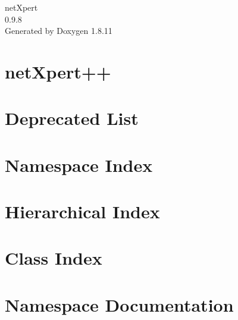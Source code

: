 \documentclass[twoside]{book}
\newcommand{\+}{\discretionary{\mbox{\scriptsize$\hookleftarrow$}}{}{}}
\newcommand{\clearemptydoublepage}{%
  \newpage{\pagestyle{empty}\cleardoublepage}%
}
\begin{document}
\hypersetup{pageanchor=false,
             bookmarksnumbered=true,
             pdfencoding=unicode
            }
\begin{titlepage}
\vspace*{7cm}
\begin{center}%
{\Large net\+Xpert \\[1ex]\large 0.\+9.\+8 }\\
\vspace*{1cm}
{\large Generated by Doxygen 1.8.11}\\
\end{center}
\end{titlepage}
\clearemptydoublepage
\tableofcontents
\clearemptydoublepage
{}
\hypersetup{pageanchor=true}

\chapter{net\+Xpert++}
\label{index}\hypertarget{index}{}
\chapter{Deprecated List}
\label{deprecated}
\hypertarget{deprecated}{}

\chapter{Namespace Index}

\chapter{Hierarchical Index}

\chapter{Class Index}

\chapter{Namespace Documentation}







\end{document}
